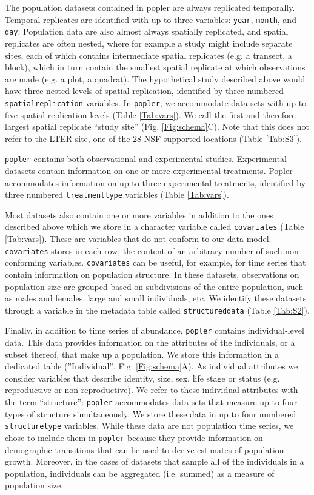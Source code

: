 \documentclass{article}\usepackage[]{graphicx}\usepackage[]{color}
\begin{document}
The population datasets contained in popler are always replicated temporally. Temporal replicates are identified with up to three variables: \texttt{year}, \texttt{month}, and \texttt{day}. Population data are also almost always spatially replicated, and spatial replicates are often nested, where for example a study might include separate sites, each of which contains intermediate spatial replicates (e.g. a transect, a block), which in turn contain the smallest spatial replicate at which observations are made (e.g. a plot, a quadrat). The hypothetical study described above would have three nested levels of spatial replication, identified by three numbered \texttt{spatial\textunderscore replication} variables. In \texttt{popler}, we accommodate data sets with up to five spatial replication levels (Table \ref{Tab:vars}). We call the first and therefore largest spatial replicate ``study site'' (Fig. \ref{Fig:schema}C). Note that this does not refer to the LTER site, one of the 28 NSF-supported locations (Table \ref{Tab:S3}).

\texttt{popler} contains both observational and experimental studies. Experimental datasets contain information on one or more experimental treatments. Popler accommodates information on up to three experimental treatments, identified by three numbered \texttt{treatment\textunderscore type} variables (Table \ref{Tab:vars}). 

Most datasets also contain one or more variables in addition to the ones described above which we store in a character variable called \texttt{covariates} (Table \ref{Tab:vars}). These are variables that do not conform to our data model. \texttt{covariates} stores in each row, the content of an arbitrary number of such non-conforming variables. \texttt{covariates} can be useful, for example, for time series that contain information on population structure. In these datasets, observations on population size are grouped based on subdivisions of the entire population, such as males and females, large and small individuals, etc. We identify these datasets through a variable in the metadata table called \texttt{structured\textunderscore data} (Table \ref{Tab:S2}).

Finally, in addition to time series of abundance, \texttt{popler} contains individual-level data. This data provides information on the attributes of the individuals, or a subset thereof, that make up a population. We store this information in a dedicated table (''Individual'', Fig. \ref{Fig:schema}A). As individual attributes we consider variables that describe identity, size, sex, life stage or status (e.g. reproductive or non-reproductive). We refer to these individual attributes with the term ``structure'': \texttt{popler} accommodates data sets that measure up to four types of structure simultaneously. We store these data in up to four numbered \texttt{structure\textunderscore type} variables. While these data are not population time series, we chose to include them in \texttt{popler} because they provide information on demographic transitions that can be used to derive estimates of population growth. Moreover, in the cases of datasets that sample all of the individuals in a population, individuals can be aggregated (i.e. summed) as a measure of population size.
\end{document}
